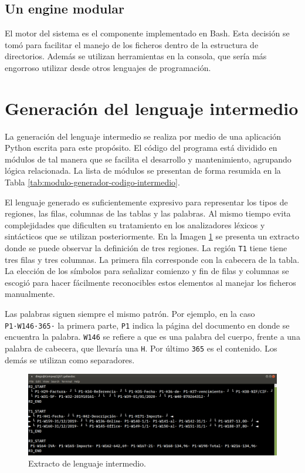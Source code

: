 \subsection{Un engine modular}

El motor del sistema es el componente implementado en Bash. Esta decisión se tomó para facilitar el manejo de los ficheros dentro de la estructura de directorios. Además se utilizan herramientas en la consola, que sería más engorroso utilizar desde otros lenguajes de programación.

\section{Generación del lenguaje intermedio}

La generación del lenguaje intermedio se realiza por medio de una aplicación Python escrita para este propósito. El código del programa está dividido en módulos de tal manera que se facilita el desarrollo y mantenimiento, agrupando lógica relacionada. La lista de módulos se presentan de forma resumida en la Tabla \ref{tab:modulo-generador-codigo-intermedio}.

El lenguaje generado es suficientemente expresivo para representar los tipos de regiones, las filas, columnas de las tablas y las palabras. Al mismo tiempo evita complejidades que dificulten su tratamiento en los analizadores léxicos y sintácticos que se utilizan posteriormente. En la Imagen \ref{fig:lenguaje-intermedio} se presenta un extracto donde se puede observar la definición de tres regiones. La región \verb|T1| tiene tiene tres filas y tres columnas. La primera fila corresponde con la cabecera de la tabla. La elección de los símbolos para señalizar comienzo y fin de filas y columnas se escogió para hacer fácilmente reconocibles estos elementos al manejar los ficheros manualmente. 

Las palabras siguen siempre el mismo patrón. Por ejemplo, en la caso \verb|P1·W146·365·| la primera parte, \verb|P1| indica la página del documento en donde se encuentra la palabra. \verb|W146| se refiere a que es una palabra del cuerpo, frente a una palabra de cabecera, que llevaría una \verb|H|. Por último \verb|365| es el contenido. Los demás se utilizan como separadores.

\begin{figure}[hp!]
    \centering
    \includegraphics[width=1.0\textwidth]{imaxes/h-implementacion/lenguaje-intermedio.png}
    \caption{Extracto de lenguaje intermedio.}
    \label{fig:lenguaje-intermedio}
\end{figure}

